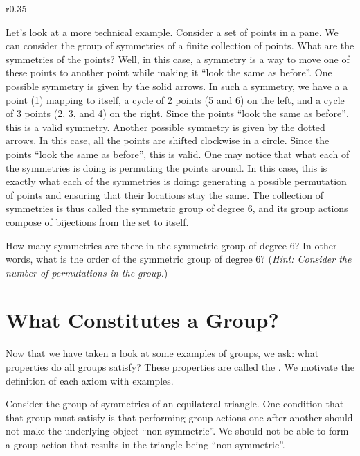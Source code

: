 \begin{wrapfigure}{r}{0.35\textwidth}
    \centering
\end{wrapfigure}

Let's look at a more technical example. Consider a set of points in a pane. We can consider the group of symmetries of a finite collection of points. What are the symmetries of the points? Well, in this case, a symmetry is a way to move one of these points to another point while making it ``look the same as before''. One possible symmetry is given by the solid arrows. In such a symmetry, we have a a point (1) mapping to itself, a cycle of 2 points (5 and 6) on the left, and a cycle of 3 points (2, 3, and 4) on the right. Since the points ``look the same as before'', this is a valid symmetry. Another possible symmetry is given by the dotted arrows. In this case, all the points are shifted clockwise in a circle. Since the points ``look the same as before'', this is valid. One may notice that what each of the symmetries is doing is permuting the points around. In this case, this is exactly what each of the symmetries is doing: generating a possible permutation of points and ensuring that their locations stay the same. The collection of symmetries is thus called the symmetric group of degree 6, and its group actions compose of bijections from the set to itself.

\begin{exercise}
    How many symmetries are there in the symmetric group of degree 6? In other words, what is the order of the symmetric group of degree 6?\newline
    (\textit{Hint: Consider the number of permutations in the group.})
\end{exercise}

\section{What Constitutes a Group?}
Now that we have taken a look at some examples of groups, we ask: what properties do all groups satisfy? These properties are called the . We motivate the definition of each axiom with examples.

Consider the group of symmetries of an equilateral triangle. One condition that that group must satisfy is that performing group actions one after another should not make the underlying object ``non-symmetric''. We should not be able to form a group action that results in the triangle being ``non-symmetric''.

